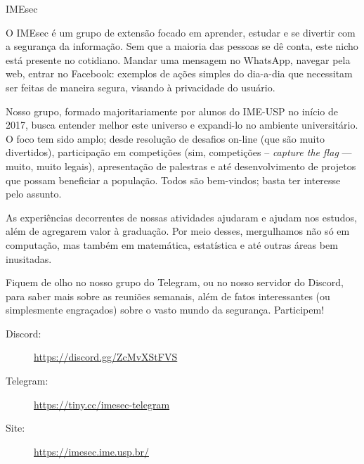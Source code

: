 \filbreak
\begin{subsecao}{IMEsec}


O IMEsec é um grupo de extensão focado em aprender, estudar e se divertir com a
segurança da informação. Sem que a maioria das pessoas se dê conta, este nicho
está presente no cotidiano. Mandar uma mensagem no WhatsApp, navegar pela web,
entrar no Facebook: exemplos de ações simples do dia-a-dia que necessitam ser
feitas de maneira segura, visando à privacidade do usuário.

Nosso grupo, formado majoritariamente por alunos do IME-USP no início de 2017,
busca entender melhor este universo e expandi-lo no ambiente universitário. O
foco tem sido amplo; desde resolução de desafios on-line (que são muito
divertidos), participação em competições (sim, competições -- \textit{capture the
flag} — muito, muito legais), apresentação de palestras e até desenvolvimento de
projetos que possam beneficiar a população. Todos são bem-vindos; basta ter
interesse pelo assunto.

As experiências decorrentes de nossas atividades ajudaram e ajudam nos estudos,
além de agregarem valor à graduação. Por meio desses, mergulhamos não só em
computação, mas também em matemática, estatística e até outras áreas bem
inusitadas.

Fiquem de olho no nosso grupo do Telegram, ou no nosso servidor do Discord, 
para saber mais sobre as reuniões semanais, além de fatos interessantes (ou 
simplesmente engraçados) sobre o vasto mundo da segurança. Participem!

\begin{description}
  \item[Discord:] \url{https://discord.gg/ZcMvXStFVS}
  \item[Telegram:] \url{https://tiny.cc/imesec-telegram}
  \item[Site:] \url{https://imesec.ime.usp.br/}
\end{description}

\end{subsecao}
